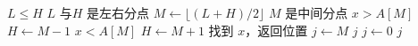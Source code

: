 \begin{codebox}
\li \While $L\le H$ \RComment $L$ 与$H$ 是左右分点
\li   \Do $M \gets \lfloor(L+H)/2\rfloor$ \RComment $M$ 是中间分点
\li     \If $x > A[M]$
\li       \Then $H \gets M-1$
\li     \ElseIf $x < A[M]$
\li       \Then $H \gets M+1$
\li     \ElseNoIf \RComment 找到 $x$，返回位置
\li       $j \gets M$
\li       \Return $j$
      \End
    \End
\li $j \gets 0$
\li \Return $j$
\end{codebox}
